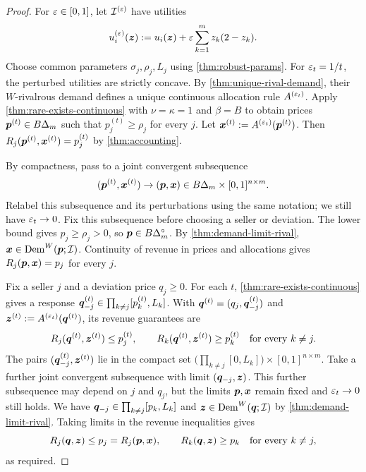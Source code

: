 \thmRivalRareExists*
\begin{proof}
For $\varepsilon \in [0, 1]$, let $\mathcal{I}^{(\varepsilon)}$ have utilities
\[ u_i^{(\varepsilon)}(\bm{z}) := u_i(\bm{z}) + \varepsilon \sum_{k = 1}^m z_k(2 - z_k). \]
Choose common parameters $\sigma_j, \rho_j, L_j$ using \cref{thm:robust-params}.
For $\varepsilon_t = 1/t$, the perturbed utilities are strictly concave.
By \cref{thm:unique-rival-demand}, their $W$-rivalrous demand defines a unique continuous
allocation rule $A^{(\varepsilon_t)}$.
Apply \cref{thm:rare-exists-continuous} with $\nu = \kappa = 1$ and $\beta = B$ to obtain
prices $\bm{p}^{(t)} \in B\Delta_m$ such that $p_j^{(t)} \ge \rho_j$ for every $j$.
Let $\bm{x}^{(t)} := A^{(\varepsilon_t)}(\bm{p}^{(t)})$.
Then $R_j(\bm{p}^{(t)}, \bm{x}^{(t)}) = p_j^{(t)}$ by \cref{thm:accounting}.

By compactness, pass to a joint convergent subsequence
\[ (\bm{p}^{(t)}, \bm{x}^{(t)}) \to (\bm{p}, \bm{x})
    \in B\Delta_m \times [0, 1]^{n \times m}. \]
Relabel this subsequence and its perturbations using the same notation;
we still have $\varepsilon_t \to 0$.
Fix this subsequence before choosing a seller or deviation.
The lower bound gives $p_j \ge \rho_j > 0$, so $\bm{p} \in B\Delta_m^\circ$.
By \cref{thm:demand-limit-rival}, $\bm{x} \in \operatorname{Dem}^W(\bm{p}; \mathcal{I})$.
Continuity of revenue in prices and allocations gives $R_j(\bm{p}, \bm{x}) = p_j$ for every $j$.

Fix a seller $j$ and a deviation price $q_j \ge 0$.
For each $t$, \cref{thm:rare-exists-continuous} gives a response
$\bm{q}_{-j}^{(t)} \in \prod_{k \ne j} [p_k^{(t)}, L_k]$.
With $\bm{q}^{(t)} = (q_j, \bm{q}_{-j}^{(t)})$ and
$\bm{z}^{(t)} := A^{(\varepsilon_t)}(\bm{q}^{(t)})$, its revenue guarantees are
\[ R_j(\bm{q}^{(t)}, \bm{z}^{(t)}) \le p_j^{(t)}, \qquad
    R_k(\bm{q}^{(t)}, \bm{z}^{(t)}) \ge p_k^{(t)} \quad \text{for every }k \ne j. \]
The pairs $(\bm{q}_{-j}^{(t)}, \bm{z}^{(t)})$ lie in the compact set
$\bigl(\prod_{k \ne j} [0, L_k]\bigr) \times [0, 1]^{n \times m}$.
Take a further joint convergent subsequence with limit $(\bm{q}_{-j}, \bm{z})$.
This further subsequence may depend on $j$ and $q_j$, but the limits
$\bm{p}, \bm{x}$ remain fixed and $\varepsilon_t \to 0$ still holds.
We have $\bm{q}_{-j} \in \prod_{k \ne j} [p_k, L_k]$ and
$\bm{z} \in \operatorname{Dem}^W(\bm{q}; \mathcal{I})$ by \cref{thm:demand-limit-rival}.
Taking limits in the revenue inequalities gives
\[ R_j(\bm{q}, \bm{z}) \le p_j = R_j(\bm{p}, \bm{x}), \qquad
    R_k(\bm{q}, \bm{z}) \ge p_k \quad \text{for every }k \ne j, \]
as required.
\end{proof}
